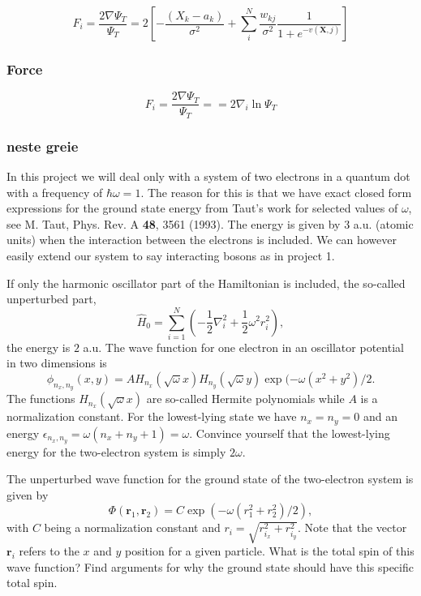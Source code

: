 \documentclass[%
oneside,                 %
final,                   %
10pt]{article}
\begin{document}
\begin{equation}
F_i = \frac{2\nabla \Psi_T}{\Psi_T} = 2 \left[- \frac{(X_k - a_k)}{\sigma^2} + \sum_{i}^N \frac{w_{kj}}{\sigma^2}\frac{1}{1 + e^{-v(\bm X,j)}} \right]
\end{equation} 



\subsubsection{Force}

\begin{equation}
F_i = \frac{2\nabla \Psi_T}{\Psi_T}= =2 \nabla_i \ln \Psi_T
\end{equation}


\subsubsection{neste greie}

In this project  we will deal only with a system of
two electrons in a quantum dot with a frequency of $\hbar\omega = 1$. 
The reason for this is that we have exact closed form expressions 
for the ground state energy from Taut's work for selected values of $\omega$, 
see M. Taut, Phys. Rev. A \textbf{48}, 3561 (1993).
The energy is given by $3$ a.u.  (atomic units) when the interaction between the electrons is included. We can however easily extend our system to say interacting bosons as in project 1.

If only the harmonic oscillator part of the Hamiltonian is included,
the so-called unperturbed part,
\begin{equation*} 
\hat{H}_0=\sum_{i=1}^{N} \left(  -\frac{1}{2} \nabla_i^2 + \frac{1}{2} \omega^2r_i^2  \right),
\end{equation*}
the energy is $2$ a.u.
The wave function for one electron in an oscillator potential in two dimensions is
\begin{equation*}
\phi_{n_x,n_y}(x,y) = A H_{n_x}(\sqrt{\omega}x)H_{n_y}(\sqrt{\omega}y)\exp{(-\omega(x^2+y^2)/2}.
\end{equation*}
The functions $H_{n_x}(\sqrt{\omega}x)$ are so-called Hermite polynomials  while $A$ is a normalization constant. 
For the lowest-lying state we have $n_x=n_y=0$ and an energy $\epsilon_{n_x,n_y}=\omega(n_x+n_y+1) = \omega$.
Convince yourself that the lowest-lying energy for the two-electron system  is simply $2\omega$.

The unperturbed wave function for the ground state of the two-electron system is given by
\begin{equation*}
\Phi(\bm{r}_1,\bm{r}_2) = C\exp{\left(-\omega(r_1^2+r_2^2)/2\right)},
\end{equation*}
with $C$ being a normalization constant and $r_i = \sqrt{r_{i_x}^2+r_{i_y}^2}$. Note that the vector $\bm{r}_i$ 
refers to the $x$ and $y$ position for a given particle.
What is the total spin of this wave function? Find arguments for why the ground state should have
this specific total spin. 
\end{document}
